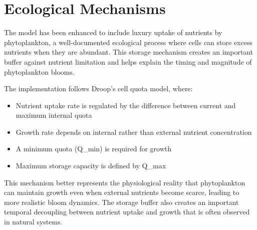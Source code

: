 \section{Ecological Mechanisms}

The model has been enhanced to include luxury uptake of nutrients by phytoplankton, a well-documented ecological process where cells can store excess nutrients when they are abundant. This storage mechanism creates an important buffer against nutrient limitation and helps explain the timing and magnitude of phytoplankton blooms.

The implementation follows Droop's cell quota model, where:
\begin{itemize}
    \item Nutrient uptake rate is regulated by the difference between current and maximum internal quota
    \item Growth rate depends on internal rather than external nutrient concentration
    \item A minimum quota (Q\_min) is required for growth
    \item Maximum storage capacity is defined by Q\_max
\end{itemize}

This mechanism better represents the physiological reality that phytoplankton can maintain growth even when external nutrients become scarce, leading to more realistic bloom dynamics. The storage buffer also creates an important temporal decoupling between nutrient uptake and growth that is often observed in natural systems.
